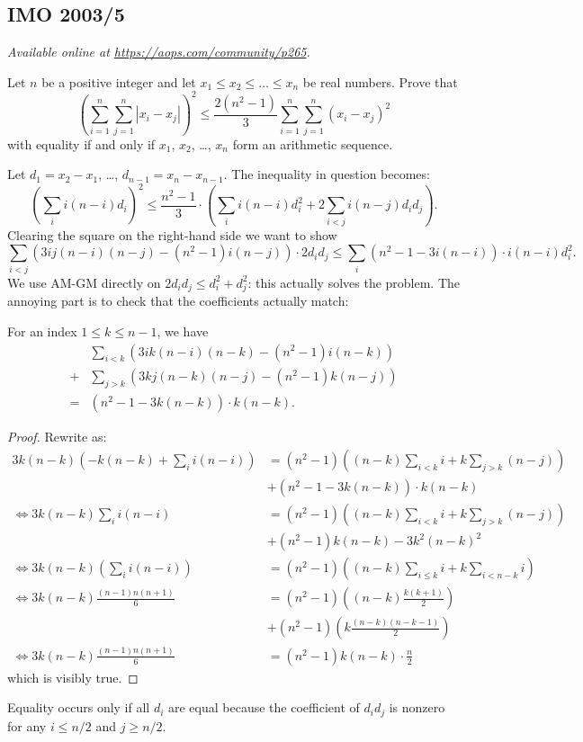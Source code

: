 \documentclass[11pt]{scrartcl}
\begin{document}
\subsection{IMO 2003/5}
\textsl{Available online at \url{https://aops.com/community/p265}.}
\begin{mdframed}[style=mdpurplebox,frametitle={Problem statement}]
Let $n$ be a positive integer and
let $x_1 \le x_2 \le \dots \le x_n$ be real numbers.
Prove that
\[ \left(\sum_{i=1}^{n}\sum_{j=1}^{n} |x_i - x_j|\right)^2
  \le \frac{2(n^2-1)}{3}\sum_{i=1}^{n}\sum_{j=1}^{n} (x_i - x_j)^2 \]
with equality if and only if $x_1$, $x_2$, \dots, $x_n$
form an arithmetic sequence.
\end{mdframed}
Let $d_1 = x_2 - x_1$, \dots, $d_{n-1} = x_n - x_{n-1}$.
The inequality in question becomes:
\[
  \left( \sum_i i(n-i) d_i \right)^2
  \le
  \frac{n^2-1}{3} \cdot
  \left( \sum_i i(n-i) d_i^2 + 2\sum_{i<j} i(n-j) d_i d_j  \right).
\]
Clearing the square on the right-hand side we want to show
\[
  \sum_{i<j} \left( 3ij(n-i)(n-j) - (n^2-1)i(n-j) \right) \cdot 2d_i d_j
  \le \sum_i (n^2-1-3i(n-i)) \cdot i(n-i) d_i^2.
\]
We use AM-GM directly on $2d_i d_j \le d_i^2 + d_j^2$:
this actually solves the problem.
The annoying part is to check that the coefficients actually match:
\begin{claim*}
  For an index $1 \le k \le n-1$, we have
  \begin{align*}
    &\sum_{i<k} \left( 3ik(n-i)(n-k) - (n^2-1)i(n-k) \right) \\
    +& \sum_{j>k} \left( 3kj(n-k)(n-j) - (n^2-1)k(n-j) \right) \\
    = & (n^2-1-3k(n-k)) \cdot k(n-k).
  \end{align*}
\end{claim*}
\begin{proof}
  Rewrite as:
  \begin{align*}
    3k(n-k) \left( -k(n-k) + \sum_i i(n-i) \right)
      &= (n^2-1)\left( (n-k)\sum_{i<k} i + k\sum_{j>k} (n-j) \right) \\
      &+ (n^2-1-3k(n-k)) \cdot k(n-k) \\
    \iff 3k(n-k) \sum_i i(n-i)
      &= (n^2-1) \left( (n-k)\sum_{i<k} i + k\sum_{j>k}(n-j) \right) \\
      &+ (n^2-1)k(n-k) - 3k^2(n-k)^2 \\
    \iff 3k(n-k) \left( \sum_{i} i(n-i) \right)
      &= (n^2-1) \left( (n-k)\sum_{i \le k} i + k \sum_{i < n-k} i \right) \\
    \iff 3k(n-k) \frac{(n-1)n(n+1)}{6}
      &= (n^2-1) \left( (n-k)\frac{k(k+1)}{2} \right) \\
      & + (n^2-1) \left( k \frac{(n-k)(n-k-1)}{2} \right) \\
    \iff 3k(n-k) \frac{(n-1)n(n+1)}{6}
      &= (n^2-1)k(n-k) \cdot \frac n2
  \end{align*}
  which is visibly true.
\end{proof}
Equality occurs only if all $d_i$ are equal
because the coefficient of $d_i d_j$ is nonzero
for any $i \le n/2$ and $j \ge n/2$.
\pagebreak
\end{document}
